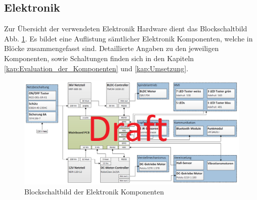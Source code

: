 \subsection{Elektronik}

Zur Übersicht der verwendeten Elektronik Hardware dient das Blockschaltbild Abb. \ref{fig:Blockschaltbild_Komponenten}. Es bildet eine Auflistung sämtlicher Elektronik Komponenten, welche in Blöcke zusammengefasst sind. Detaillierte Angaben zu den jeweiligen Komponenten, sowie Schaltungen finden sich in den Kapiteln \ref{kap:Evaluation_der_Komponenten} und \ref{kap:Umsetzung}.


\begin{figure}[H]
	\includegraphics[width=1\textwidth]{Illustrationen/5-Konzept/Blockschaltbild_Komponenten.png}
	\caption{Blockschaltbild der Elektronik Komponenten}
	\label{fig:Blockschaltbild_Komponenten}
\end{figure}

